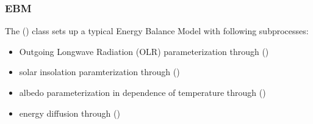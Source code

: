 \documentclass[a4paper,10pt,english]{sphinxmanual}
\begin{document}
\subsubsection{EBM}
\label{models:ebm}
The {\hyperref[api/climlab.model:climlab.model.ebm.EBM]{\emph{}}} () class sets up a typical Energy Balance Model with following subprocesses:
\begin{itemize}
\item {} 
Outgoing Longwave Radiation (OLR) parameterization through
{\hyperref[api/climlab.radiation:climlab.radiation.AplusBT.AplusBT]{\emph{}}} ()

\item {} 
solar insolation paramterization through
{\hyperref[api/climlab.radiation:climlab.radiation.insolation.P2Insolation]{\emph{}}} ()

\item {} 
albedo parameterization in dependence of temperature through
{\hyperref[api/climlab.surface:climlab.surface.albedo.StepFunctionAlbedo]{\emph{}}} ()

\item {} 
energy diffusion through
{\hyperref[api/climlab.dynamics:climlab.dynamics.diffusion.MeridionalDiffusion]{\emph{}}} ()

\end{itemize}
\end{document}
